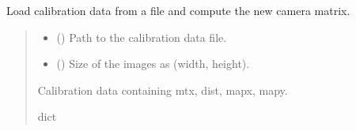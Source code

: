 \documentclass[letterpaper,10pt,english]{sphinxmanual}
\begin{document}
\begin{fulllineitems}
\label{\detokenize{PoseEstimator:PoseEstimator.pose_estimator.load_calibration_data}}
\pysigstartsignatures
{}
\pysigstopsignatures
\sphinxAtStartPar
Load calibration data from a file and compute the new camera matrix.
\begin{quote}\begin{description}
\begin{itemize}
\item {} 
\sphinxAtStartPar
{} () \textendash{} Path to the calibration data file.

\item {} 
\sphinxAtStartPar
{} () \textendash{} Size of the images as (width, height).

\end{itemize}

\sphinxAtStartPar
Calibration data containing mtx, dist, mapx, mapy.

\sphinxAtStartPar
dict

\end{description}\end{quote}

\end{fulllineitems}


\begin{fulllineitems}
\label{\detokenize{PoseEstimator:PoseEstimator.pose_estimator.plotXYZ}}
\pysigstartsignatures
{}
\pysigstopsignatures
\end{fulllineitems}

\end{document}
